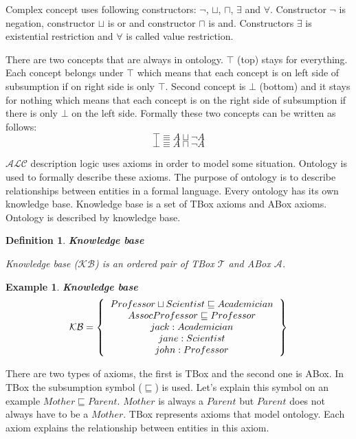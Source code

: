 \documentclass[12pt,a4paper]{article}
\newtheorem{definition}{Definition}[subsection]
\newtheorem{example}{Example}[subsection]
\begin{document}
Complex concept uses following constructors: $\neg$, $\sqcup$, $\sqcap$, $\exists$ and $\forall$. Constructor $\neg$ is negation, constructor $\sqcup$ is or and constructor $\sqcap$ is and. Constructors $\exists$ is existential restriction and $\forall$ is called value restriction.

There are two concepts that are always in ontology. $\top$ (top) stays for everything. Each concept belongs under $\top$ which means that each concept is on left side of subsumption if on right side is only $\top$. Second concept is $\bot$ (bottom) and it stays for nothing which means that each concept is on the right side of subsumption if there is only $\bot$ on the left side. Formally these two concepts can be written as follows:
\[ \top \equiv A \sqcup \neg A \]
\[ \bot \equiv A \sqcap \neg A \]

$\mathcal{ALC}$ description logic uses axioms in order to model some situation. Ontology \citep{staabHandbookOntology} is used to formally describe these axioms. The purpose of ontology is to describe relationships between entities in a formal language. Every ontology has its own knowledge base. Knowledge base is a set of TBox axioms and ABox axioms. Ontology is described by knowledge base.

\begin{definition}{\textbf{Knowledge base}}
	
	Knowledge base ($\mathcal{KB}$) is an ordered pair of \textit{TBox} $\mathcal{T}$ and \textit{ABox} $\mathcal{A}$.
\end{definition}

\begin{example}{\textbf{Knowledge base}}
	\[ 
	\mathcal{KB} = \left\{
	\begin{tabular}{c c}
	$Professor \sqcup Scientist \sqsubseteq Academician$ \\
	$AssocProfessor \sqsubseteq Professor$ \\
	$jack : Academician$ \\
	$jane : Scientist$ \\
	$john : Professor$ \\	
	\end{tabular}
	\right \}
	\]
\end{example}

There are two types of axioms, the first is TBox and the second one is ABox. In TBox the subsumption symbol ($\sqsubseteq$) is used. Let's explain this symbol on an example $Mother \sqsubseteq Parent$. $Mother$ is always a $Parent$ but $Parent$ does not always have to be a $Mother$. TBox represents axioms that model ontology. Each axiom explains the relationship between entities in this axiom.
\end{document}
